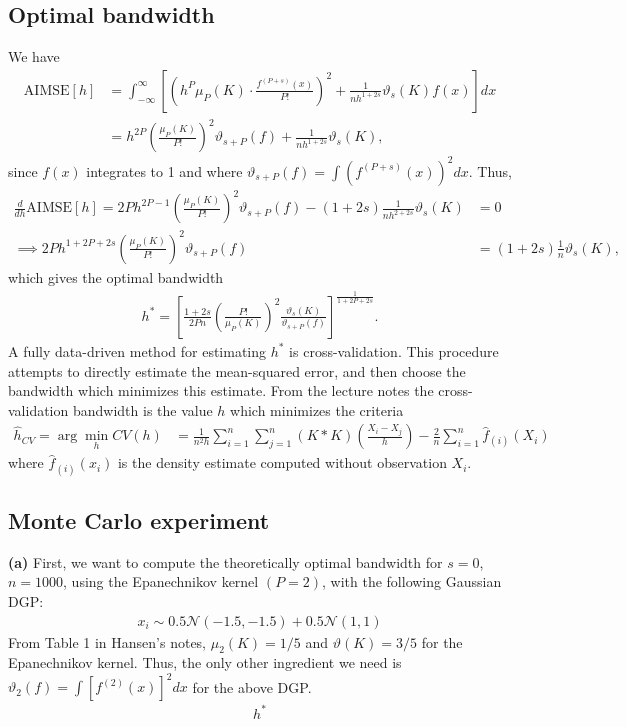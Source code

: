 \documentclass[12pt]{article}
\newcommand{\N}{\mathcal{N}}
\begin{document}
\newpage

\subsection{Optimal bandwidth}
We have
\begin{align*}
\text{AIMSE} [h] &= \int_{-\infty}^{\infty} \left[\left(h^P \mu_P(K) \cdot \frac{f^{(P+s)}(x)}{P!}\right)^2+\frac{1}{nh^{1+2s}}\vartheta_s(K)f(x)\right]dx\\
&= h^{2P}\left(\frac{\mu_P(K)}{P!}\right)^2\vartheta_{s+P}(f) + \frac{1}{nh^{1+2s}}\vartheta_s(K),
\end{align*}
since $f(x)$ integrates to 1 and where $\vartheta_{s+P}(f) = \int (f^{(P+s)}(x))^2dx$. Thus,
\begin{align*}
\frac{d}{dh}\text{AIMSE} [h] = 2Ph^{2P-1}\left(\frac{\mu_P(K)}{P!}\right)^2\vartheta_{s+P}(f) - (1+2s)\frac{1}{nh^{2+2s}}\vartheta_s(K)&=0\\
\implies 2Ph^{1+2P+2s}\left(\frac{\mu_P(K)}{P!}\right)^2\vartheta_{s+P}(f)  &=(1+2s)\frac{1}{n}\vartheta_s(K),
\end{align*}
which gives the optimal bandwidth
\begin{align*}
h^* = \left[\frac{1+2s}{2Pn}\left(\frac{P!}{\mu_P(K)}\right)^2\frac{\vartheta_s(K)}{\vartheta_{s+P}(f)}\right]^{\frac{1}{1+2P+2s}}.
\end{align*}
A fully data-driven method for estimating $h^*$ is cross-validation. This procedure attempts to directly estimate the mean-squared error, and then choose the bandwidth which minimizes this estimate. From the lecture notes the cross-validation bandwidth is the value $h$ which minimizes the criteria
\begin{align*}
\hat h_{CV} = \arg \min_{h} CV(h) &= \frac{1}{n^2h} \sum_{i=1}^n \sum_{j=1}^n (K*K) \left(\frac{X_i - X_j}{h}\right) - \frac{2}{n}\sum_{i=1}^n \hat f_{(i)}(X_i)
\end{align*}
where $ \hat f_{(i)}(x_i)$ is the density estimate computed without observation $X_i$.

\subsection{Monte Carlo experiment}

\textbf{(a)} First, we want to compute the theoretically optimal bandwidth for $s=0$, $n=1000$, using the Epanechnikov kernel $(P=2)$, with the following Gaussian DGP:
\begin{align*}
x_i \sim 0.5 \N(-1.5,-1.5) + 0.5\N(1,1)
\end{align*}
From Table 1 in Hansen's notes, $\mu_2(K)=1/5$ and $\vartheta(K)=3/5$ for the Epanechnikov kernel. Thus, the only other ingredient we need is $\vartheta_{2}(f) = \int [f^{(2)}(x)]^2 dx$ for the above DGP.
\begin{align*}
h^*
\end{align*}
\end{document}
